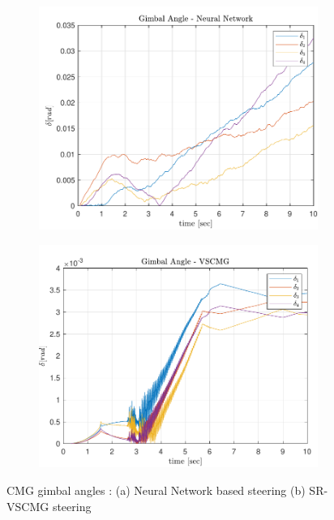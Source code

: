 \begin{figure}[ht]
     \centering
     \begin{subfigure}[b]{0.49\textwidth}
         \centering
         \includegraphics[width=\textwidth]{figures/plots/Results/vs-nn-delta.pdf}
          \caption{}
         \label{fig:nn_delta}
     \end{subfigure}
     \begin{subfigure}[b]{0.49\textwidth}
         \centering
         \includegraphics[width=\textwidth]{figures/plots/Results/vs-vs-delta.pdf}
          \caption{}
         \label{fig:vs_delta}
     \end{subfigure}
     
        \caption{CMG gimbal angles : (a) Neural Network based steering (b) SR-VSCMG steering}
        \label{fig:nnvscmg_delta}
\end{figure}
